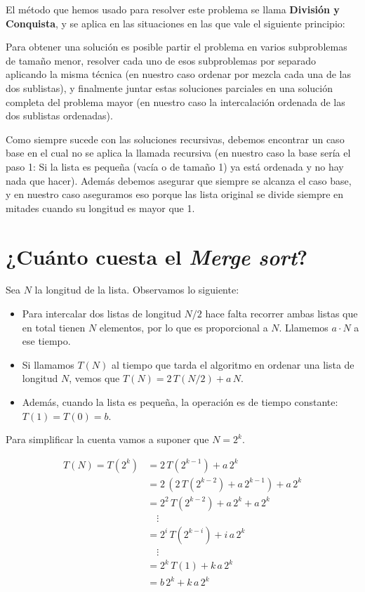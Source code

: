 \begin{sabias_que}
El método que hemos usado para resolver este problema se llama {\bf División y
Conquista}, y se aplica en las situaciones en las que vale el siguiente
principio:

Para obtener una solución es posible partir el problema en varios subproblemas
de tamaño menor, resolver cada uno de esos subproblemas por separado aplicando
la misma técnica (en nuestro caso ordenar por mezcla cada una de las dos
sublistas), y finalmente juntar estas soluciones parciales en una solución
completa del problema mayor (en nuestro caso la intercalación ordenada de las
dos sublistas ordenadas).

Como siempre sucede con las soluciones recursivas, debemos encontrar un caso
base en el cual no se aplica la llamada recursiva (en nuestro caso la base
sería el paso 1: Si la lista es pequeña (vacía o de tamaño 1) ya está ordenada
y no hay nada que hacer). Además debemos asegurar que siempre se alcanza el
caso base, y en nuestro caso aseguramos eso porque las lista original se divide
siempre en mitades cuando su longitud es mayor que 1.
\end{sabias_que}

\section{¿Cuánto cuesta el \emph{Merge sort}?}
Sea $N$ la longitud de la lista. Observamos lo siguiente:
\begin{itemize}

\item Para intercalar dos listas de longitud $N/2$ hace falta recorrer
ambas listas que en total tienen $N$ elementos, por lo que es proporcional
a $N$. Llamemos $a \cdot N$ a ese tiempo.

\item Si llamamos $T(N)$ al tiempo que tarda el algoritmo en ordenar
una lista de longitud $N$, vemos que $T(N) = 2 \, T(N/2) + a \, N$.

\item Además, cuando la lista es pequeña, la operación es de tiempo
constante: $T(1) = T(0) = b$.
\end{itemize}

Para simplificar la cuenta vamos a suponer que $N = 2^k$.

\begin{align*}
T(N) = T(2^k) &= 2 \, T(2^{k-1}) + a \, 2^k \\
              &= 2 \, \left( 2 \, T(2^{k-2} ) + a \, 2^{k-1} \right) + a \, 2^k\\
&= 2^2 \, T(2^{k-2} ) + a \, 2^k +a \, 2^k\\
&\quad\vdots\\
&= 2^i \, T(2^{k-i})+ i \, a \, 2^k\\
&\quad\vdots\\
&= 2^k \, T(1) + k \, a \, 2^k\\
&= b \, 2^k  + k \, a \, 2^k
\end{align*}

